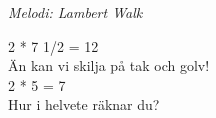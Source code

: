 {\footnotesize\textit{Melodi: Lambert Walk}}\par
\vspace{10pt}
2 * 7 1/2 = 12\\
Än kan vi skilja på tak och golv!\\
2 * 5 = 7\\
Hur i helvete räknar du?
